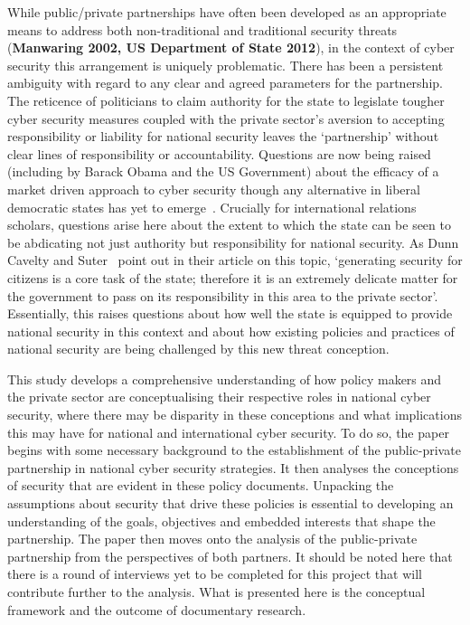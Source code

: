 \documentclass[a4paper,11pt]{article}
\begin{document}
While public/private partnerships have often been developed as an
appropriate means to address both non-traditional and traditional
security threats ({\textbf{Manwaring 2002, US Department of State
2012}}), in the context of cyber security this arrangement is uniquely
problematic. There has been a persistent ambiguity with regard to any
clear and agreed parameters for the partnership. The reticence of
politicians to claim authority for the state to legislate tougher
cyber security measures coupled with the private sector’s aversion to
accepting responsibility or liability for national security leaves the
‘partnership’ without clear lines of responsibility or
accountability. Questions are now being raised (including by Barack
Obama and the US Government) about the efficacy of a market driven
approach to cyber security though any alternative in liberal
democratic states has yet to emerge~\cite{obama:2009}. Crucially for
international relations scholars, questions arise here about the
extent to which the state can be seen to be abdicating not just
authority but responsibility for national security. As Dunn Cavelty and
Suter~\cite{dunncavelty+suter:2009} point out in their article on
this topic, `generating security for citizens is a core task of the
state; therefore it is an extremely delicate matter for the government
to pass on its responsibility in this area to the private sector'.
Essentially, this raises questions about how well the state is
equipped to provide national security in this context and about how
existing policies and practices of national security are being
challenged by this new threat conception.

This study develops a comprehensive understanding of how policy makers
and the private sector are conceptualising their respective roles in
national cyber security, where there may be disparity in these
conceptions and what implications this may have for national and
international cyber security. To do so, the paper begins with some
necessary background to the establishment of the public-private
partnership in national cyber security strategies. It then analyses
the conceptions of security that are evident in these policy
documents. Unpacking the assumptions about security that drive these
policies is essential to developing an understanding of the goals,
objectives and embedded interests that shape the partnership. The
paper then moves onto the analysis of the public-private partnership
from the perspectives of both partners. It should be noted here that
there is a round of interviews yet to be completed for this project
that will contribute further to the analysis. What is presented here
is the conceptual framework and the outcome of documentary research.
\end{document}
